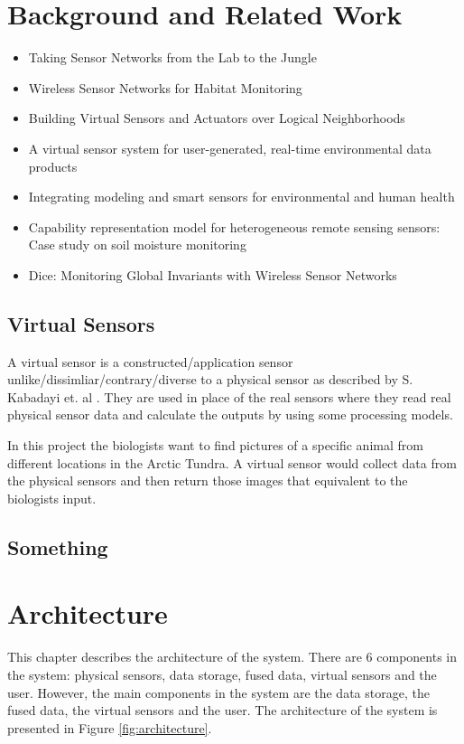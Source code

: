 \documentclass[USenglish]{uit-thesis}
\begin{document}
\chapter{Background and Related Work}
\begin{itemize}
\item Taking Sensor Networks from the Lab to the Jungle
\item Wireless Sensor Networks for Habitat Monitoring
\item Building Virtual Sensors and Actuators over Logical Neighborhoods
\item A virtual sensor system for user-generated, real-time environmental data products
\item Integrating modeling and smart sensors for environmental and human health
\item Capability representation model for heterogeneous remote sensing sensors: Case study on soil moisture monitoring
\item Dice: Monitoring Global Invariants with Wireless Sensor Networks
\end{itemize}


\section{Virtual Sensors}
A virtual sensor is a constructed/application sensor unlike/dissimliar/contrary/diverse to a physical sensor as described by S. Kabadayi et. al \cite{VirtualSensors2006}. They are used in place of the real sensors where they read real physical sensor data and calculate the outputs by using some processing models.

In this project the biologists want to find pictures of a specific animal from different locations in the Arctic Tundra. A virtual sensor would collect data from the physical sensors and then return those images that equivalent to the biologists input.


\section{Something}

\chapter{Architecture}
This chapter describes the architecture of the system.
There are 6 components in the system: physical sensors, data storage, fused data, virtual sensors and the user. However, the main components in the system are the data storage, the fused data, the virtual sensors and the user.
The architecture of the system is presented in Figure \ref{fig:architecture}.
\end{document}
